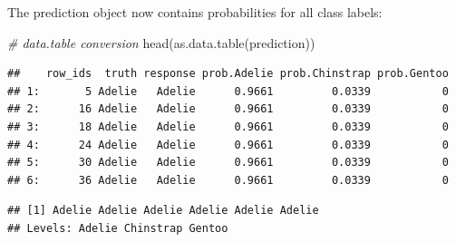 \documentclass[
]{scrbook}
\newenvironment{Shaded}{\begin{snugshade}}{\end{snugshade}}
\newcommand{\AttributeTok}[1]{\textcolor[rgb]{0.77,0.63,0.00}{#1}}
\newcommand{\CommentTok}[1]{\textcolor[rgb]{0.56,0.35,0.01}{\textit{#1}}}
\newcommand{\FunctionTok}[1]{\textcolor[rgb]{0.00,0.00,0.00}{#1}}
\newcommand{\NormalTok}[1]{#1}
\newcommand{\OtherTok}[1]{\textcolor[rgb]{0.56,0.35,0.01}{#1}}
\newcommand{\SpecialCharTok}[1]{\textcolor[rgb]{0.00,0.00,0.00}{#1}}
\newcommand{\StringTok}[1]{\textcolor[rgb]{0.31,0.60,0.02}{#1}}
\renewenvironment{Shaded} {\begin{snugshade}\small} {\end{snugshade}}
\begin{document}
\begin{Shaded}
\end{Shaded}

The prediction object now contains probabilities for all class labels:

\begin{Shaded}
\begin{Highlighting}[]
\CommentTok{\# data.table conversion}
\FunctionTok{head}\NormalTok{(}\FunctionTok{as.data.table}\NormalTok{(prediction))}
\end{Highlighting}
\end{Shaded}

\begin{verbatim}
##    row_ids  truth response prob.Adelie prob.Chinstrap prob.Gentoo
## 1:       5 Adelie   Adelie      0.9661         0.0339           0
## 2:      16 Adelie   Adelie      0.9661         0.0339           0
## 3:      18 Adelie   Adelie      0.9661         0.0339           0
## 4:      24 Adelie   Adelie      0.9661         0.0339           0
## 5:      30 Adelie   Adelie      0.9661         0.0339           0
## 6:      36 Adelie   Adelie      0.9661         0.0339           0
\end{verbatim}

\begin{Shaded}
\end{Shaded}

\begin{verbatim}
## [1] Adelie Adelie Adelie Adelie Adelie Adelie
## Levels: Adelie Chinstrap Gentoo
\end{verbatim}

\begin{Shaded}
\end{Shaded}
\end{document}
